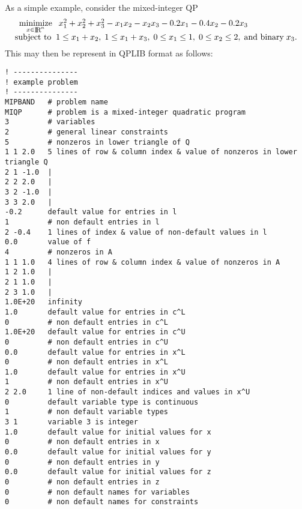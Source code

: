 As a simple example, consider the mixed-integer QP
\[\arr{l}{\mininx{} x_1^2 + x_2^2 + x_3^2 - x_1 x_2 - x_2 x_3
  - 0.2 x_1  -0.4 x_2 - 0.2 x_3 \\
\st 1 \leq x_1 + x_2, \; 1 \leq x_1 + x_3, \; 0 \leq x_1 \leq 1,
\; 0 \leq x_2 \leq 2, \; \mbox{and binary} \; x_3.}
\]
This may then be represent in QPLIB format as follows:

{\small
\begin{verbatim}
! ---------------
! example problem
! ---------------
MIPBAND   # problem name
MIQP      # problem is a mixed-integer quadratic program
3         # variables
2         # general linear constraints
5         # nonzeros in lower triangle of Q
1 1 2.0   5 lines of row & column index & value of nonzeros in lower triangle Q
2 1 -1.0  |
2 2 2.0   |
3 2 -1.0  |
3 3 2.0   |
-0.2      default value for entries in l
1         # non default entries in l
2 -0.4    1 lines of index & value of non-default values in l
0.0       value of f
4         # nonzeros in A
1 1 1.0   4 lines of row & column index & value of nonzeros in A
1 2 1.0   |
2 1 1.0   |
2 3 1.0   |
1.0E+20   infinity
1.0       default value for entries in c^L
0         # non default entries in c^L
1.0E+20   default value for entries in c^U
0         # non default entries in c^U
0.0       default value for entries in x^L
0         # non default entries in x^L
1.0       default value for entries in x^U
1         # non default entries in x^U
2 2.0     1 line of non-default indices and values in x^U
0         default variable type is continuous
1         # non default variable types
3 1       variable 3 is integer
1.0       default value for initial values for x
0         # non default entries in x
0.0       default value for initial values for y
0         # non default entries in y
0.0       default value for initial values for z
0         # non default entries in z
0         # non default names for variables
0         # non default names for constraints
\end{verbatim}
}



